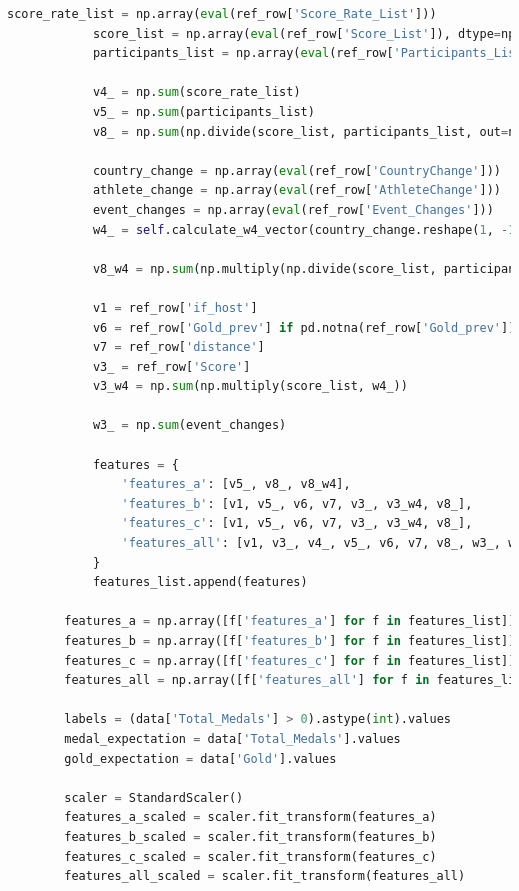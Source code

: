 \documentclass[12pt]{article}
\begin{document}
\begin{lstlisting}[language=Python, style=mystyle, caption=model.ipynb]
            score_rate_list = np.array(eval(ref_row['Score_Rate_List']))
            score_list = np.array(eval(ref_row['Score_List']), dtype=np.float64)
            participants_list = np.array(eval(ref_row['Participants_List']), dtype=np.float64)

            v4_ = np.sum(score_rate_list)
            v5_ = np.sum(participants_list)
            v8_ = np.sum(np.divide(score_list, participants_list, out=np.zeros_like(score_list, dtype=np.float64), where=participants_list > 0))

            country_change = np.array(eval(ref_row['CountryChange']))
            athlete_change = np.array(eval(ref_row['AthleteChange']))
            event_changes = np.array(eval(ref_row['Event_Changes']))
            w4_ = self.calculate_w4_vector(country_change.reshape(1, -1), athlete_change.reshape(1, -1), event_changes.reshape(1, -1))[0]

            v8_w4 = np.sum(np.multiply(np.divide(score_list, participants_list, out=np.zeros_like(score_list, dtype=np.float64), where=participants_list > 0), w4_))

            v1 = ref_row['if_host']
            v6 = ref_row['Gold_prev'] if pd.notna(ref_row['Gold_prev']) else 0
            v7 = ref_row['distance']
            v3_ = ref_row['Score']
            v3_w4 = np.sum(np.multiply(score_list, w4_))

            w3_ = np.sum(event_changes)

            features = {
                'features_a': [v5_, v8_, v8_w4],
                'features_b': [v1, v5_, v6, v7, v3_, v3_w4, v8_],
                'features_c': [v1, v5_, v6, v7, v3_, v3_w4, v8_],
                'features_all': [v1, v3_, v4_, v5_, v6, v7, v8_, w3_, w4_]
            }
            features_list.append(features)

        features_a = np.array([f['features_a'] for f in features_list])
        features_b = np.array([f['features_b'] for f in features_list])
        features_c = np.array([f['features_c'] for f in features_list])
        features_all = np.array([f['features_all'] for f in features_list])

        labels = (data['Total_Medals'] > 0).astype(int).values
        medal_expectation = data['Total_Medals'].values
        gold_expectation = data['Gold'].values

        scaler = StandardScaler()
        features_a_scaled = scaler.fit_transform(features_a)
        features_b_scaled = scaler.fit_transform(features_b)
        features_c_scaled = scaler.fit_transform(features_c)
        features_all_scaled = scaler.fit_transform(features_all)


\end{lstlisting}
\end{document}
